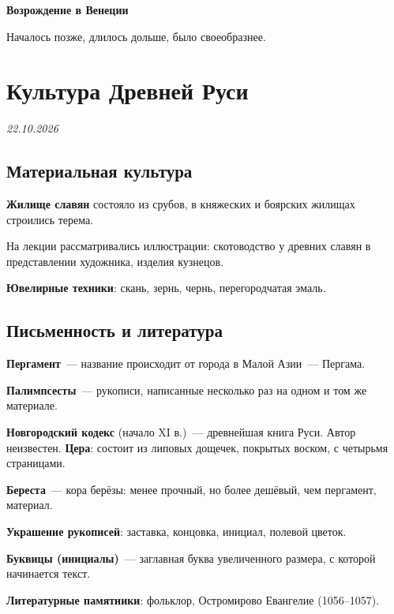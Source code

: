 \documentclass[a4paper, 12pt]{article}
\newcommand{\lecdate}[1]{\vspace{-4pt}\hfill{\small\textit{#1}}\par}
\begin{document}
\begin{center}
\textbf{Возрождение в Венеции}
\end{center}
Началось позже, длилось дольше, было своеобразнее.

\section{Культура Древней Руси}
\lecdate{22.10.2026}

\subsection{Материальная культура}
\textbf{Жилище славян} состояло из срубов, в княжеских и боярских жилищах
строились терема.

На лекции рассматривались иллюстрации: скотоводство у древних славян в
представлении художника, изделия кузнецов.

\textbf{Ювелирные техники}: скань, зернь, чернь, перегородчатая эмаль.

\subsection{Письменность и литература}
\textbf{Пергамент}~--- название происходит от города в Малой Азии~--- Пергама.

\textbf{Палимпсесты}~--- рукописи, написанные несколько раз на одном и том же
материале.

\textbf{Новгородский кодекс} (начало XI в.)~--- древнейшая книга Руси. Автор
неизвестен. \textbf{Цера}: состоит из липовых дощечек, покрытых воском,
с четырьмя страницами.

\textbf{Береста}~--- кора берёзы: менее прочный, но более дешёвый, чем
пергамент, материал.

\textbf{Украшение рукописей}: заставка, концовка, инициал, полевой цветок.

\textbf{Буквицы (инициалы)}~--- заглавная буква увеличенного размера, с
которой начинается текст.

\textbf{Литературные памятники}: фольклор, Остромирово Евангелие
(1056--1057).
\end{document}
